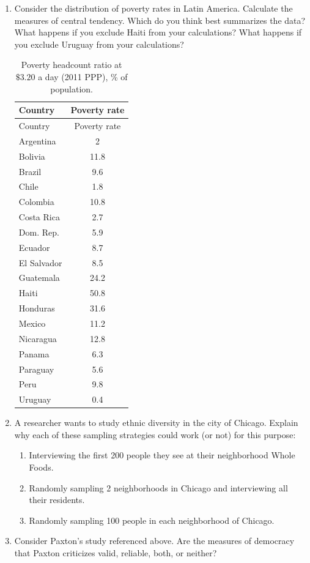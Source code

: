 \documentclass{book}
\begin{document}
\begin{enumerate}
\def\labelenumi{\arabic{enumi}.}
\item
  Consider the distribution of poverty rates in Latin America. Calculate the
  measures of central tendency. Which do you think best summarizes the data?
  What happens if you exclude Haiti from your calculations? What happens if
  you exclude Uruguay from your calculations?

  \begin{longtable}[]{@{}lc@{}}
  \caption{Poverty headcount ratio at \(\$3.20\) a day (2011 PPP), \% of
  population.}\tabularnewline
  \toprule
  Country & Poverty rate \\
  \midrule
  \endfirsthead
  \toprule
  Country & Poverty rate \\
  \midrule
  \endhead
  Argentina & 2 \\
  Bolivia & 11.8 \\
  Brazil & 9.6 \\
  Chile & 1.8 \\
  Colombia & 10.8 \\
  Costa Rica & 2.7 \\
  Dom. Rep. & 5.9 \\
  Ecuador & 8.7 \\
  El Salvador & 8.5 \\
  Guatemala & 24.2 \\
  Haiti & 50.8 \\
  Honduras & 31.6 \\
  Mexico & 11.2 \\
  Nicaragua & 12.8 \\
  Panama & 6.3 \\
  Paraguay & 5.6 \\
  Peru & 9.8 \\
  Uruguay & 0.4 \\
  \bottomrule
  \end{longtable}
\item
  A researcher wants to study ethnic diversity in the city of Chicago. Explain
  why each of these sampling strategies could work (or not) for this purpose:

  \begin{enumerate}
  \def\labelenumii{\arabic{enumii}.}
  \item
    Interviewing the first 200 people they see at their neighborhood Whole
    Foods.
  \item
    Randomly sampling 2 neighborhoods in Chicago and interviewing all their
    residents.
  \item
    Randomly sampling 100 people in each neighborhood of Chicago.
  \end{enumerate}
\item
  Consider Paxton's study referenced above. Are the measures of democracy that
  Paxton criticizes valid, reliable, both, or neither?
\end{enumerate}
\end{document}
